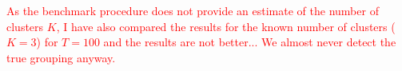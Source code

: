 \documentclass[a4paper,12pt]{article}
\begin{document}
\textcolor{red}{As the benchmark procedure does not provide an estimate of the number of clusters $K$, I have also compared the results for the known number of clusters ($K=3$) for $T=100$ and the results are not better... We almost never detect the true grouping anyway.}

  
\end{document}
